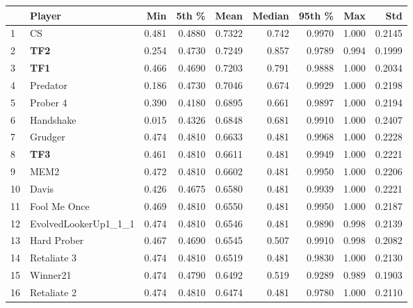 \begin{tabular}{llrrrrrrr}
\toprule
{} &                Player &    Min &   5th \% &    Mean &  Median &  95th \% &    Max &     Std \\
\midrule
1  &                    CS &  0.481 &  0.4880 &  0.7322 &   0.742 &  0.9970 &  1.000 &  0.2145 \\
2  &                   \textbf{TF2} &  0.254 &  0.4730 &  0.7249 &   0.857 &  0.9789 &  0.994 &  0.1999 \\
3  &                   \textbf{TF1} &  0.466 &  0.4690 &  0.7203 &   0.791 &  0.9888 &  1.000 &  0.2034 \\
4  &              Predator &  0.186 &  0.4730 &  0.7046 &   0.674 &  0.9929 &  1.000 &  0.2198 \\
5  &              Prober 4 &  0.390 &  0.4180 &  0.6895 &   0.661 &  0.9897 &  1.000 &  0.2194 \\
6  &             Handshake &  0.015 &  0.4326 &  0.6848 &   0.681 &  0.9910 &  1.000 &  0.2407 \\
7  &               Grudger &  0.474 &  0.4810 &  0.6633 &   0.481 &  0.9968 &  1.000 &  0.2228 \\
8  &                   \textbf{TF3} &  0.461 &  0.4810 &  0.6611 &   0.481 &  0.9949 &  1.000 &  0.2221 \\
9  &                  MEM2 &  0.472 &  0.4810 &  0.6602 &   0.481 &  0.9950 &  1.000 &  0.2206 \\
10 &                 Davis &  0.426 &  0.4675 &  0.6580 &   0.481 &  0.9939 &  1.000 &  0.2221 \\
11 &          Fool Me Once &  0.469 &  0.4810 &  0.6550 &   0.481 &  0.9950 &  1.000 &  0.2187 \\
12 &  EvolvedLookerUp1\_1\_1 &  0.474 &  0.4810 &  0.6546 &   0.481 &  0.9890 &  0.998 &  0.2139 \\
13 &           Hard Prober &  0.467 &  0.4690 &  0.6545 &   0.507 &  0.9910 &  0.998 &  0.2082 \\
14 &           Retaliate 3 &  0.474 &  0.4810 &  0.6519 &   0.481 &  0.9830 &  1.000 &  0.2130 \\
15 &              Winner21 &  0.474 &  0.4790 &  0.6492 &   0.519 &  0.9289 &  0.989 &  0.1903 \\
16 &           Retaliate 2 &  0.474 &  0.4810 &  0.6474 &   0.481 &  0.9780 &  1.000 &  0.2110 \\
\bottomrule
\end{tabular}
